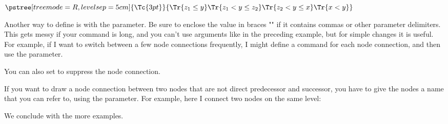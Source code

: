 \documentclass[11pt,english,BCOR10mm,DIV12,bibliography=totoc,parskip=false,smallheadings
    headexclude,footexclude,oneside]{pst-doc}
\begin{document}
\begin{LTXexample}
$
\def\psedge#1#2{\ncdiagg[angleA=180,armA=1cm,nodesep=4pt]{#2}{#1}}
\pstree[treemode=R, levelsep=5cm]{\Tc{3pt}}{%
  \Tr{z_1\leq y}  \Tr{z_1<y\leq z_2}   \Tr{z_2<y\leq x}   \Tr{x<y}
}
$
\end{LTXexample}

Another way to define \Largb{} is with the 
parameter. Be sure to enclose the value in braces "{}" if it contains commas
or other parameter delimiters. This gets messy if your command is long, and
you can't use arguments like in the preceding example, but for simple changes
it is useful. For example, if I want to switch between a few node connections
frequently, I might define a command for each node connection, and then use
the  parameter.

\begin{LTXexample}[pos=l,width=0.4\linewidth]
  \def\dedge{\ncline[linestyle=dashed]}
  \pstree[treemode=U,radius=2pt]{\Tc{3pt}}{%
    \TC*[edge=\dedge]
    \pstree{\Tc{3pt}}{\TC*[edge=\dedge] \TC*}
    \TC*}
\end{LTXexample}

You can also set  to suppress the node connection.

If you want to draw a node connection between two nodes that are not direct
predecessor and successor, you have to give the nodes a name that you can
refer to, using the  parameter. For example, here I connect two nodes
on the same level:

\begin{LTXexample}[pos=l,width=0.4\linewidth]
\end{LTXexample}

We conclude with the more examples.

\begin{LTXexample}[pos=l,width=0.4\linewidth]
  \def\psedge{\nccurve[angleB=180, nodesepB=3pt]}
\end{LTXexample}

\begin{LTXexample}[pos=l,width=0.4\linewidth]
\end{LTXexample}
\end{document}
